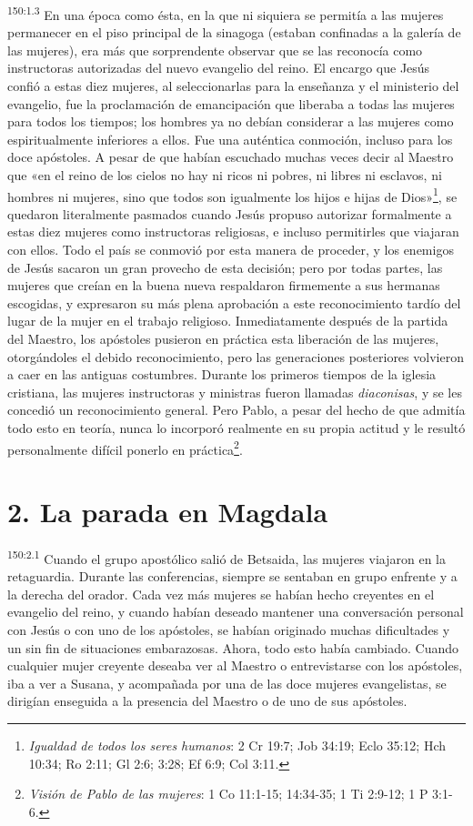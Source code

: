 \par
\textsuperscript{150:1.3} En una época como ésta, en la que ni siquiera se permitía a las mujeres permanecer en el piso principal de la sinagoga (estaban confinadas a la galería de las mujeres), era más que sorprendente observar que se las reconocía como instructoras autorizadas del nuevo evangelio del reino. El encargo que Jesús confió a estas diez mujeres, al seleccionarlas para la enseñanza y el ministerio del evangelio, fue la proclamación de emancipación que liberaba a todas las mujeres para todos los tiempos; los hombres ya no debían considerar a las mujeres como espiritualmente inferiores a ellos. Fue una auténtica conmoción, incluso para los doce apóstoles. A pesar de que habían escuchado muchas veces decir al Maestro que «en el reino de los cielos no hay ni ricos ni pobres, ni libres ni esclavos, ni hombres ni mujeres, sino que todos son igualmente los hijos e hijas de Dios»\footnote{\textit{Igualdad de todos los seres humanos}: 2 Cr 19:7; Job 34:19; Eclo 35:12; Hch 10:34; Ro 2:11; Gl 2:6; 3:28; Ef 6:9; Col 3:11.}, se quedaron literalmente pasmados cuando Jesús propuso autorizar formalmente a estas diez mujeres como instructoras religiosas, e incluso permitirles que viajaran con ellos. Todo el país se conmovió por esta manera de proceder, y los enemigos de Jesús sacaron un gran provecho de esta decisión; pero por todas partes, las mujeres que creían en la buena nueva respaldaron firmemente a sus hermanas escogidas, y expresaron su más plena aprobación a este reconocimiento tardío del lugar de la mujer en el trabajo religioso. Inmediatamente después de la partida del Maestro, los apóstoles pusieron en práctica esta liberación de las mujeres, otorgándoles el debido reconocimiento, pero las generaciones posteriores volvieron a caer en las antiguas costumbres. Durante los primeros tiempos de la iglesia cristiana, las mujeres instructoras y ministras fueron llamadas \textit{diaconisas}, y se les concedió un reconocimiento general. Pero Pablo, a pesar del hecho de que admitía todo esto en teoría, nunca lo incorporó realmente en su propia actitud y le resultó personalmente difícil ponerlo en práctica\footnote{\textit{Visión de Pablo de las mujeres}: 1 Co 11:1-15; 14:34-35; 1 Ti 2:9-12; 1 P 3:1-6.}.

\section*{2. La parada en Magdala}
\par
\textsuperscript{150:2.1} Cuando el grupo apostólico salió de Betsaida, las mujeres viajaron en la retaguardia. Durante las conferencias, siempre se sentaban en grupo enfrente y a la derecha del orador. Cada vez más mujeres se habían hecho creyentes en el evangelio del reino, y cuando habían deseado mantener una conversación personal con Jesús o con uno de los apóstoles, se habían originado muchas dificultades y un sin fin de situaciones embarazosas. Ahora, todo esto había cambiado. Cuando cualquier mujer creyente deseaba ver al Maestro o entrevistarse con los apóstoles, iba a ver a Susana, y acompañada por una de las doce mujeres evangelistas, se dirigían enseguida a la presencia del Maestro o de uno de sus apóstoles.

